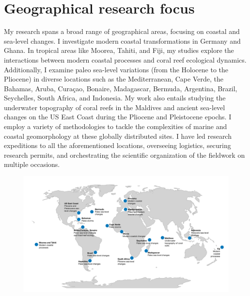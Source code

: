 \documentclass[11pt]{article}
\begin{document}
\section{Geographical research focus}
{\normalfont My research spans a broad range of geographical areas, focusing on coastal and sea-level changes. I investigate modern coastal transformations in Germany and Ghana. In tropical areas like Moorea, Tahiti, and Fiji, my studies explore the interactions between modern coastal processes and coral reef ecological dynamics. Additionally, I examine paleo sea-level variations (from the Holocene to the Pliocene) in diverse locations such as the Mediterranean, Cape Verde, the Bahamas, Aruba, Curaçao, Bonaire, Madagascar, Bermuda, Argentina, Brazil, Seychelles, South Africa, and Indonesia. My work also entails studying the underwater topography of coral reefs in the Maldives and ancient sea-level changes on the US East Coast during the Pliocene and Pleistocene epochs. I employ a variety of methodologies to tackle the complexities of marine and coastal geomorphology at these globally distributed sites. I have led research expeditions to all the aforementioned locations, overseeing logistics, securing research permits, and orchestrating the scientific organization of the fieldwork on multiple occasions.}


\begin{figure}[h]
\centering
\includegraphics[width=\textwidth]{Research_map/field_data.pdf}
\end{figure}

\newpage
\end{document}
